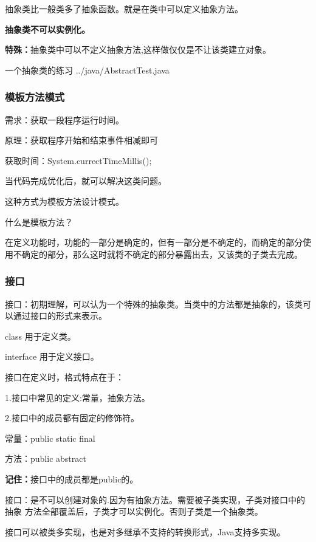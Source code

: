 \documentclass[UTF8]{ctexart}
\begin{document}
抽象类比一般类多了抽象函数。就是在类中可以定义抽象方法。

\textbf{抽象类不可以实例化。}

\textbf{特殊：}抽象类中可以不定义抽象方法,这样做仅仅是不让该类建立对象。


一个抽象类的练习
 {../java/AbstractTest.java}

\subsubsection{模板方法模式}

需求：获取一段程序运行时间。

原理：获取程序开始和结束事件相减即可

获取时间：System.currectTimeMillis();

当代码完成优化后，就可以解决这类问题。

这种方式为模板方法设计模式。

什么是模板方法？

在定义功能时，功能的一部分是确定的，但有一部分是不确定的，而确定的部分使用不确定的部分，那么这时就将不确定的部分暴露出去，又该类的子类去完成。	


\subsubsection{接口}

接口：初期理解，可以认为一个特殊的抽象类。当类中的方法都是抽象的，该类可以通过接口的形式来表示。

class 用于定义类。

interface 用于定义接口。

接口在定义时，格式特点在于：

1.接口中常见的定义:常量，抽象方法。

2.接口中的成员都有固定的修饰符。

\quad \textbullet 常量：public static final

\quad \textbullet 方法：public abstract

\textbf{记住：}接口中的成员都是public的。

接口：是不可以创建对象的.因为有抽象方法。需要被子类实现，子类对接口中的抽象
方法全部覆盖后，子类才可以实例化。否则子类是一个抽象类。

接口可以被类多实现，也是对多继承不支持的转换形式，Java支持多实现。
\end{document}
